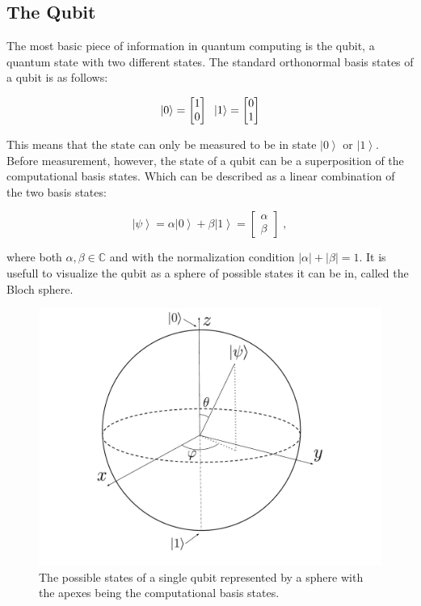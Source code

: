 \subsection{The Qubit}

The most basic piece of information in quantum computing is the qubit, a quantum state with two different states. The standard orthonormal basis states of a qubit is as follows:

$$ \left | 0 \right > = \begin{bmatrix}
    1 \\ 0
\end{bmatrix} \; \space \; \left | 1 \right > = \begin{bmatrix}
    0 \\ 1
\end{bmatrix}$$

This means that the state can only be measured to be in state $\left | 0 \right >$ or $\left | 1 \right >$. Before measurement, however, the state of a qubit can be a superposition of the computational basis states. Which can be described as a linear combination of the two basis states:

$$\left | \psi \right > = \alpha \left | 0 \right > + \beta \left | 1 \right > = \begin{bmatrix}
    \alpha \\ \beta
\end{bmatrix}\; ,$$

where both $\alpha, \beta \in \mathbb{C}$ and with the normalization condition $\lvert\alpha\rvert + \lvert\beta\rvert = 1$. It is usefull to visualize the qubit as a sphere of possible states it can be in, called the Bloch sphere.

\begin{figure}[H]
    \centering
    \includegraphics[width=\textwidth]{Figures/Drawn/bloch pshere.pdf}
    \caption{The possible states of a single qubit represented by a sphere with the apexes being the computational basis states.}
    \label{fig:blochsphere}
\end{figure}

